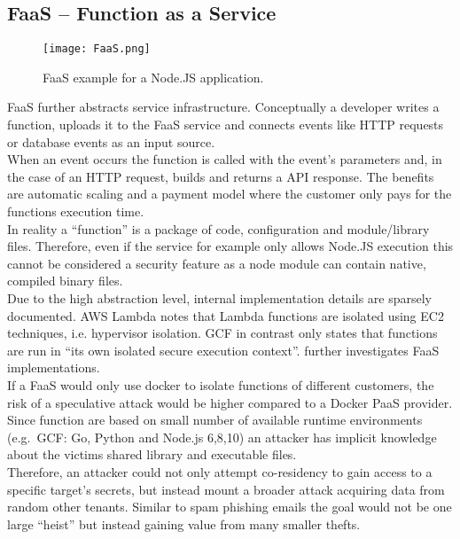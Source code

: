 \documentclass[conference,compsoc,final,a4paper]{IEEEtran}
\begin{document}
\subsection{\acs{FaaS} -- Function as a Service}
\begin{figure}[!ht]
\centering
\texttt{[image: FaaS.png]}
\caption{\ac{FaaS} example for a Node.JS application.}
\label{virtmem}
\end{figure}
\acs{FaaS} further abstracts service infrastructure. Conceptually a developer writes a function, uploads it to the \acs{FaaS} service and connects events like HTTP requests or
database events as an input source. \\
When an event occurs the function is called with the event's parameters and, in the case of an HTTP request, builds and
returns a API response. The benefits are automatic scaling and a payment model where the customer only pays for the functions execution time. \cite{lambdaFeatures}\\
In reality a \enquote{function} is a package of code, configuration and module/library files. Therefore, even if the service for example only allows Node.JS execution
this cannot be considered a security feature as a node module can contain native, compiled binary files. \cite{lambdaFaq} \\
Due to the high abstraction level, internal implementation details are sparsely documented. \ac{AWS} Lambda notes that Lambda functions are isolated using EC2 techniques, i.e.
hypervisor isolation\cite{lambdaFaq}. \ac{GCF} in contrast only states that functions are run in
\enquote{its own isolated secure execution context}\cite{cloudFunc}. \textcite{wang2018peeking} further investigates \acs{FaaS} implementations. \\
If a \acs{FaaS} would only use docker to isolate functions of different customers, the risk of a speculative attack would be higher compared to a Docker \ac{PaaS} provider. Since function are based on small number of available runtime environments (e.g.\ \ac{GCF}: Go, Python and Node.js 6,8,10) \cite{cloudFunc} an attacker has implicit knowledge
about the victims shared library and executable files. \\
Therefore, an attacker could not only attempt co-residency to gain access to a specific target's secrets, but instead mount a broader attack acquiring data from random
other tenants. Similar to spam phishing emails the goal would not be one large \enquote{heist} but instead gaining value from many smaller thefts.
\end{document}
